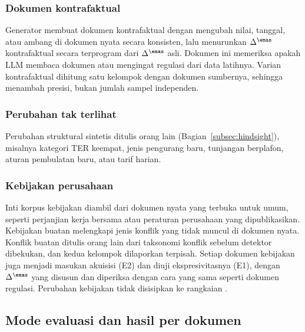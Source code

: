 \subsubsection{Dokumen kontrafaktual}
Generator membuat dokumen kontrafaktual dengan mengubah nilai, tanggal, atau ambang di dokumen nyata secara konsisten, lalu menurunkan $\Delta^{\emas}$ kontrafaktual secara terprogram dari $\Delta^{\emas}$ asli. Dokumen ini memeriksa apakah LLM membaca dokumen atau mengingat regulasi dari data latihnya. Varian kontrafaktual dihitung satu kelompok dengan dokumen sumbernya, sehingga menambah presisi, bukan jumlah sampel independen.

\subsubsection{Perubahan tak terlihat}
Perubahan struktural sintetis ditulis orang lain (Bagian~\ref{subsec:hindsight}), misalnya kategori TER keempat, jenis pengurang baru, tunjangan berplafon, aturan pembulatan baru, atau tarif harian.

\subsubsection{Kebijakan perusahaan}
Inti korpus kebijakan diambil dari dokumen nyata yang terbuka untuk umum, seperti perjanjian kerja bersama atau peraturan perusahaan yang dipublikasikan. Kebijakan buatan melengkapi jenis konflik yang tidak muncul di dokumen nyata. Konflik buatan ditulis orang lain dari taksonomi konflik sebelum detektor dibekukan, dan kedua kelompok dilaporkan terpisah. Setiap dokumen kebijakan juga menjadi masukan akuisisi (E2) dan diuji ekspresivitasnya (E1), dengan $\Delta^{\emas}$ yang disusun dan diperiksa dengan cara yang sama seperti dokumen regulasi. Perubahan kebijakan tidak disisipkan ke rangkaian .


\subsection{Mode evaluasi dan hasil per dokumen}
\label{subsec:mode}

